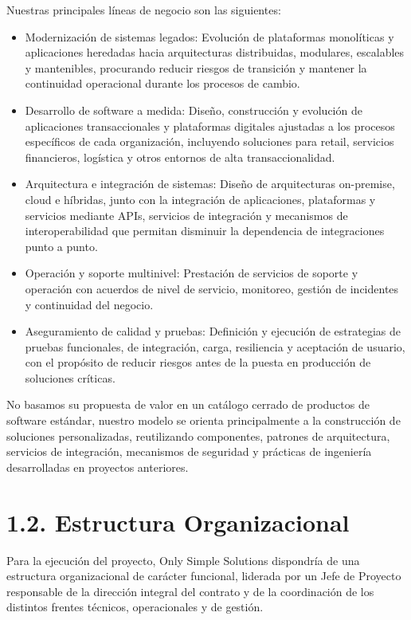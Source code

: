 \documentclass[11pt]{article}
\providecommand{\tightlist}{%
  \setlength{\itemsep}{0pt}\setlength{\parskip}{0pt}}
\begin{document}
Nuestras principales líneas de negocio son las siguientes:

\begin{itemize}
\tightlist
\item
  Modernización de sistemas legados: Evolución de plataformas monolíticas y aplicaciones heredadas hacia arquitecturas distribuidas, modulares, escalables y mantenibles, procurando reducir riesgos de transición y mantener la continuidad operacional durante los procesos de cambio.
\item
  Desarrollo de software a medida: Diseño, construcción y evolución de aplicaciones transaccionales y plataformas digitales ajustadas a los procesos específicos de cada organización, incluyendo soluciones para retail, servicios financieros, logística y otros entornos de alta transaccionalidad.
\item
  Arquitectura e integración de sistemas: Diseño de arquitecturas on-premise, cloud e híbridas, junto con la integración de aplicaciones, plataformas y servicios mediante APIs, servicios de integración y mecanismos de interoperabilidad que permitan disminuir la dependencia de integraciones punto a punto.
\item
  Operación y soporte multinivel: Prestación de servicios de soporte y operación con acuerdos de nivel de servicio, monitoreo, gestión de incidentes y continuidad del negocio.
\item
  Aseguramiento de calidad y pruebas: Definición y ejecución de estrategias de pruebas funcionales, de integración, carga, resiliencia y aceptación de usuario, con el propósito de reducir riesgos antes de la puesta en producción de soluciones críticas.
\end{itemize}

No basamos su propuesta de valor en un catálogo cerrado de productos de software estándar, nuestro modelo se orienta principalmente a la construcción de soluciones personalizadas, reutilizando componentes, patrones de arquitectura, servicios de integración, mecanismos de seguridad y prácticas de ingeniería desarrolladas en proyectos anteriores.

\section{1.2. Estructura Organizacional}\label{estructura-organizacional}

Para la ejecución del proyecto, Only Simple Solutions dispondría de una estructura organizacional de carácter funcional, liderada por un Jefe de Proyecto responsable de la dirección integral del contrato y de la coordinación de los distintos frentes técnicos, operacionales y de gestión.
\end{document}
